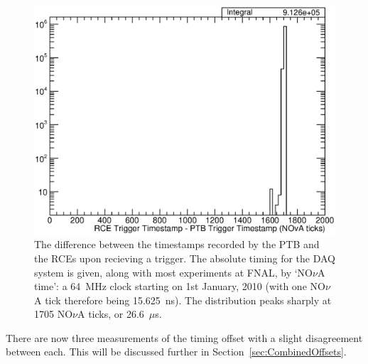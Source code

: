 \begin{figure}
  \centering
  \includegraphics[width=12cm]{PTBRCEDiffTimestamps.eps}
  \caption[The difference between the timestamps recorded by the PTB and the RCEs upon recieving a trigger.]{The difference between the timestamps recorded by the PTB and the RCEs upon recieving a trigger.  The absolute timing for the DAQ system is given, along with most experiments at FNAL, by `NO$\nu$A time': a 64~MHz clock starting on 1st January, 2010 (with one NO$\nu$A tick therefore being 15.625~ns).  The distribution peaks sharply at 1705 NO$\nu$A ticks, or 26.6~$\mu$s.}
  \label{fig:TPCCounterOffset}
\end{figure}

There are now three measurements of the timing offset with a slight disagreement between each.  This will be discussed further in Section~\ref{sec:CombinedOffsets}.


